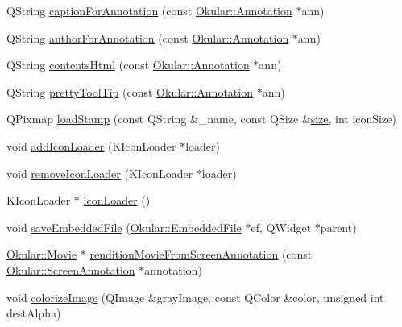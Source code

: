\begin{DoxyCompactItemize}
\item 
Q\+String \hyperlink{namespaceGuiUtils_af15abd3dd32e982db3f842e807146835}{caption\+For\+Annotation} (const \hyperlink{classOkular_1_1Annotation}{Okular\+::\+Annotation} $\ast$ann)
\item 
Q\+String \hyperlink{namespaceGuiUtils_a53e2db452488c1d84b5078a9e6b73420}{author\+For\+Annotation} (const \hyperlink{classOkular_1_1Annotation}{Okular\+::\+Annotation} $\ast$ann)
\item 
Q\+String \hyperlink{namespaceGuiUtils_a196f609501411f2cda3679872bc2ec9a}{contents\+Html} (const \hyperlink{classOkular_1_1Annotation}{Okular\+::\+Annotation} $\ast$ann)
\item 
Q\+String \hyperlink{namespaceGuiUtils_a4277357b6408ce44cf183cd7765bcc72}{pretty\+Tool\+Tip} (const \hyperlink{classOkular_1_1Annotation}{Okular\+::\+Annotation} $\ast$ann)
\item 
Q\+Pixmap \hyperlink{namespaceGuiUtils_a5ba797636890ba5fbc39db6a092f4bd5}{load\+Stamp} (const Q\+String \&\+\_\+name, const Q\+Size \&\hyperlink{synctex__parser_8c_aa23c661441688350614bd6a350d2b6ff}{size}, int icon\+Size)
\item 
void \hyperlink{namespaceGuiUtils_a72fd83c2762e1f347bb81b65b4094409}{add\+Icon\+Loader} (K\+Icon\+Loader $\ast$loader)
\item 
void \hyperlink{namespaceGuiUtils_a2d6ad4bc8343a4ea890f14b3d7492e3f}{remove\+Icon\+Loader} (K\+Icon\+Loader $\ast$loader)
\item 
K\+Icon\+Loader $\ast$ \hyperlink{namespaceGuiUtils_aa855f96a43d2d14c51acb8282d775d0a}{icon\+Loader} ()
\item 
void \hyperlink{namespaceGuiUtils_a5e934d5070afd94f91b3a5fbfb8cbc04}{save\+Embedded\+File} (\hyperlink{classOkular_1_1EmbeddedFile}{Okular\+::\+Embedded\+File} $\ast$ef, Q\+Widget $\ast$parent)
\item 
\hyperlink{classOkular_1_1Movie}{Okular\+::\+Movie} $\ast$ \hyperlink{namespaceGuiUtils_a51c606d14a293d5b3f5f49ad1c12be44}{rendition\+Movie\+From\+Screen\+Annotation} (const \hyperlink{classOkular_1_1ScreenAnnotation}{Okular\+::\+Screen\+Annotation} $\ast$annotation)
\item 
void \hyperlink{namespaceGuiUtils_a989345da409cc84c3636efad1b174cb5}{colorize\+Image} (Q\+Image \&gray\+Image, const Q\+Color \&color, unsigned int dest\+Alpha)
\end{DoxyCompactItemize}



